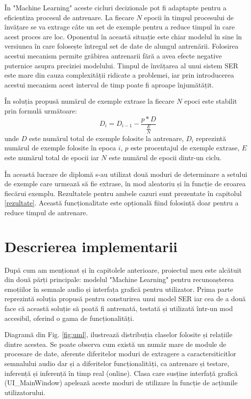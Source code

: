 \documentclass[a4paper,12pt]{book}
\begin{document}
				 În "Machine Learning" aceste cicluri decizionale pot fi adaptapte pentru a eficientiza procesul de antrenare. La fiecare $N$ epocii în timpul procesului de învățare se va extrage câte un set de exemple pentru a reduce timpul în care acest proces are loc. Oponentul în această situație este chiar modelul în sine în versiunea în care folosește întregul set de date de alungul antrenării.  Folosirea acestui mecanism permite grăbirea antrenarii fără a avea efecte negative puternice asupra preciziei modelului. Timpul de învățarea al unui sistem SER este mare din cauza complexității ridicate a problemei, iar prin introducerea acestui mecanism acest interval de timp poate fi aproape înjumătățit. \par
				 
				 În soluția propusă numărul de exemple extrase la fiecare $N$ epoci este stabilit prin formulă următoare:
				 \begin{equation}
				 	D_i = D_{i-1} - \frac{p * D}{\frac{E}{N}}
				 \end{equation}
				  unde $D$ este numărul total de exemple folosite la antrenare, $D_i$ reprezintă numărul de exemple folosite în epoca $i$, $p$ este procentajul de exemple extrase, $E$ este numărul total de epocii iar $N$ este numărul de epocii dintr-un ciclu. \par
				 În această lucrare de diplomă s-au utilizat două moduri de determinare a setului de exemple care urmează să fie extrase, în mod aleatoriu și în funcție de eroarea fiecărui exemplu. Rezultatele pentru ambele cazuri sunt prezentate în capitolul \ref{rezultate}. Această funcționalitate este opțională fiind folosință doar pentru a reduce timpul de antrenare.
		\chapter{Descrierea implementarii}
				După cum am menționat și în capitolele anterioare, proiectul meu este alcătuit din două părți principale: modelul "Machine Learning" pentru recunoașterea emoțiilor în semnale audio și interfața grafică pentru utilizator. Prima parte reprezintă soluția propusă pentru consturirea unui model SER iar cea de a două face că această soluție să poată fi antrenată, testată și utilizată într-un mod accesibil, oferind o gama de funcționalități.\par 
				Diagramă din Fig. \ref{fig:uml}, ilustrează distribuția claselor folosite și relațiile dintre acestea. Se poate observa cum există un număr mare de module de procesare de date, aferente diferitelor moduri de extragere a caractersiticitlor semnalului audio dar și a diferitelor funcționalități, ca antrenare și testare, inferență și inferență în timp real (online). Clasa care susține interfață grafică (UI\_MainWindow) apelează aceste moduri de utilizare în funcție de acțiunile utilizatorului. \par
				
\end{document}
